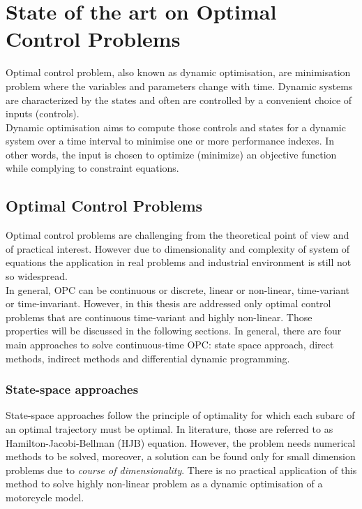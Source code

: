 \section{State of the art on Optimal Control Problems} 

Optimal control problem, also known as dynamic optimisation, are minimisation problem where the variables and parameters change with time. Dynamic systems are characterized by the states and often are controlled by a convenient choice of inputs (controls).\\
Dynamic optimisation aims to compute those controls and states for a dynamic system over a time interval to minimise one or more performance indexes. In other words, the input is chosen to optimize (minimize) an objective function while complying to constraint equations.

\subsection{Optimal Control Problems}
Optimal control problems are challenging from the theoretical point of view and of practical interest. However due to dimensionality and complexity of system of equations the application in real problems and industrial environment is still not so widespread.\\
In general, OPC can be continuous or discrete, linear or non-linear, time-variant or time-invariant. However, in this thesis are addressed only optimal control problems that are continuous time-variant and highly non-linear. Those properties will be discussed in the following sections. %
In general, there are four main approaches to solve continuous-time OPC: state space approach, direct methods, indirect methods and differential dynamic programming.


\subsubsection{State-space approaches}

State-space approaches follow the principle of optimality for which each subarc of an optimal trajectory must be optimal. In literature, those are referred to as Hamilton-Jacobi-Bellman (HJB) equation. However, the problem needs numerical methods to be solved, moreover, a solution can be found only for small dimension problems due to \textit{course of dimensionality}. There is no practical application of this method to solve highly non-linear problem as a dynamic optimisation of a motorcycle model.

